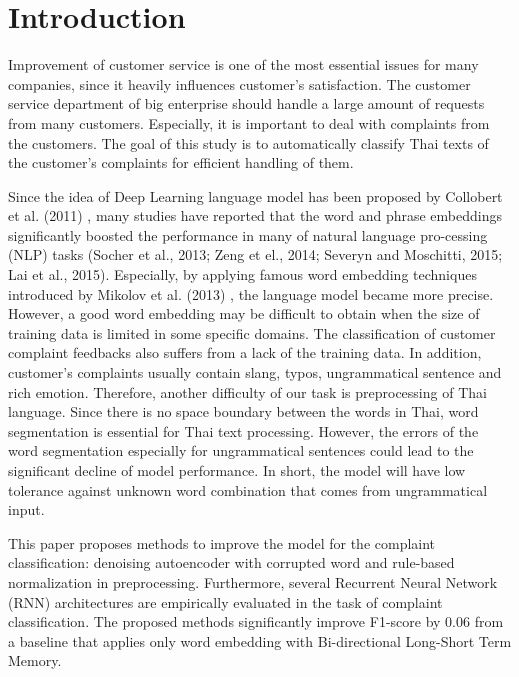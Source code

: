 \setlength{\parindent}{0.5cm}
\section{Introduction}
Improvement of customer service is one of the most essential issues for many companies,
since it heavily influences customer's satisfaction.
The customer service department of big enterprise should handle a large amount
of requests from many customers.
Especially, it is important to deal with complaints from the customers.
The goal of this study is to automatically classify Thai texts of the customer's
complaints for efficient handling of them.


Since the idea of Deep Learning language model has been proposed
by Collobert et al. (2011) \cite{journals/corr/abs-1103-0398}, many studies have
reported that the word and phrase embeddings significantly boosted
the performance in many of natural language pro-cessing (NLP) tasks
(Socher et al., 2013; Zeng et el., 2014; Severyn and Moschitti, 2015; Lai et al., 2015).
\cite{socher2013recursive,zeng2014relation,severyn2015twitter,lai2015recurrent}
Especially, by applying famous word embedding techniques introduced by
Mikolov et al. (2013) \cite{mikolov2013distributed}, the language model became more precise.
However, a good word embedding may be difficult to obtain when the size of training data is
limited in some specific domains. The classification of customer complaint feedbacks
also suffers from a lack of the training data. In addition, customer's complaints
usually contain slang, typos, ungrammatical sentence and rich emotion.
Therefore, another difficulty of our task is preprocessing of Thai language.
Since there is no space boundary between the words in Thai, word segmentation is essential
for Thai text processing. However, the errors of the word segmentation especially for
ungrammatical sentences could lead to the significant decline of model performance.
In short, the model will have low tolerance against unknown word combination that
comes from ungrammatical input.


This paper proposes methods to improve the model for the complaint classification: 
denoising autoencoder with corrupted word and rule-based normalization in preprocessing.
Furthermore, several Recurrent Neural Network (RNN) architectures are empirically evaluated
in the task of complaint classification. The proposed methods significantly
improve F1-score by 0.06 from a baseline that applies only word
embedding with Bi-directional Long-Short Term Memory.
